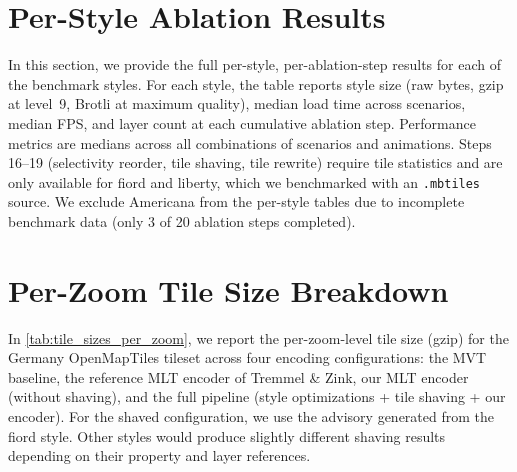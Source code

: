 \section{Per-Style Ablation Results}\label{sec:app_per_style}

In this section, we provide the full per-style, per-ablation-step results for each of the benchmark styles.
For each style, the table reports style size (raw bytes, gzip at level~9, Brotli at maximum quality), median load time across scenarios, median \ac{FPS}, and layer count at each cumulative ablation step.
Performance metrics are medians across all combinations of scenarios and animations.
Steps 16--19 (selectivity reorder, tile shaving, tile rewrite) require tile statistics and are only available for fiord and liberty, which we benchmarked with an \texttt{.mbtiles} source.
We exclude Americana from the per-style tables due to incomplete benchmark data (only 3 of 20 ablation steps completed).



\section{Per-Zoom Tile Size Breakdown}\label{app_tile_sizes}

In \cref{tab:tile_sizes_per_zoom}, we report the per-zoom-level tile size (gzip) for the Germany OpenMapTiles tileset across four encoding configurations: the \ac{MVT} baseline, the reference \ac{MLT} encoder of Tremmel \& Zink, our \ac{MLT} encoder (without shaving), and the full pipeline (style optimizations + tile shaving + our encoder).
For the shaved configuration, we use the advisory generated from the fiord style.
Other styles would produce slightly different shaving results depending on their property and layer references.

